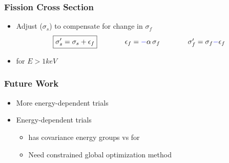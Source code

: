\begin{frame}
\frametitle{Fission Cross Section}
\begin{itemize}
  \item Adjust  ($\sigma_s$) to compensate for change in $\sigma_f$
	\begin{equation*}
	\begin{array}{ccc}
	\boxed{\sigma'_s = \sigma_s + \epsilon_f}\hspace{0.4in} &  \epsilon_f = {\colb{-}}\alpha\,\sigma_f &\hspace{0.4in} \sigma'_f = \sigma_f \colb{-} \epsilon_f%
	\end{array}
	\end{equation*}
	\item {} {for} $E>1 keV$
\end{itemize} 
\pause

\begin{table}[h!] 
	\vspace{-0.1in}
  \begin{center}
  \end{center}
\end{table}

\end{frame} 

\begin{frame}
\frametitle{Future Work}
\vspace{-0.86in}
\begin{itemize}
  \item More energy-dependent \nubar trials \pause
	\item Energy-dependent \sfiss trials \pause
	\begin{itemize}
		\item \sfiss has  covariance energy groups vs  for \nubar
		\item Need constrained global optimization method
	\end{itemize}\pause



\end{itemize} 

\end{frame} 



\setcounter{framenumber}{\value{finalframe}}


